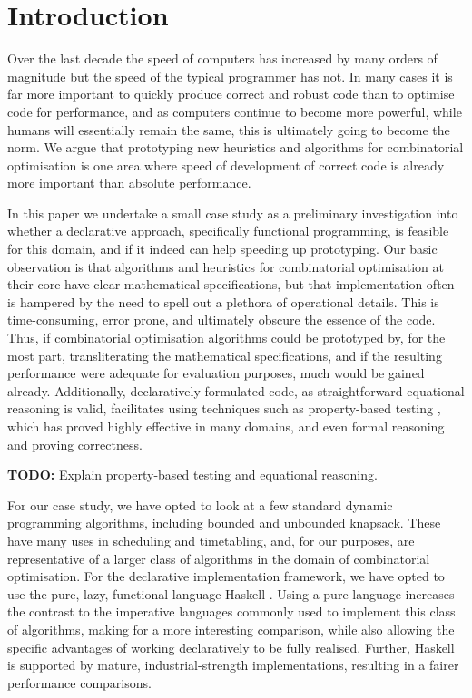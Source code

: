 \section{Introduction}

Over the last decade the speed of computers has increased by many orders of
magnitude but the speed of the typical programmer has not. In many cases it is
far more important to quickly produce correct and robust code than to optimise
code for performance, and as computers continue to become more powerful, while
humans will essentially remain the same, this is ultimately going to become
the norm. We argue that prototyping new heuristics and algorithms for
combinatorial optimisation is one area where speed of development of correct
code is already more important than absolute performance.

In this paper we undertake a small case study as a preliminary investigation
into whether a declarative approach, specifically functional programming, is
feasible for this domain, and if it indeed can help speeding up prototyping.
Our basic observation is that algorithms and heuristics for combinatorial
optimisation at their core have clear mathematical specifications, but that
implementation often is hampered by the need to spell out a plethora of
operational details. This is time-consuming, error prone, and ultimately
obscure the essence of the code. Thus, if combinatorial optimisation
algorithms could be prototyped by, for the most part, transliterating the
mathematical specifications, and if the resulting performance were adequate
for evaluation purposes, much would be gained already. Additionally,
declaratively formulated code, as straightforward equational reasoning is
valid, facilitates using techniques such as property-based testing
\cite{quickcheck}, which has proved highly effective in many domains, and even
formal reasoning and proving correctness.

\textbf{TODO:} Explain property-based testing and equational reasoning.

For our case study, we have opted to look at a few standard dynamic
programming algorithms, including bounded and unbounded knapsack. These have
many uses in scheduling and timetabling, and, for our purposes, are
representative of a larger class of algorithms in the domain of combinatorial
optimisation. For the declarative implementation framework, we have opted to
use the pure, lazy, functional language Haskell \cite{Haskell98Book}. Using a
pure language increases the contrast to the imperative languages commonly used
to implement this class of algorithms, making for a more interesting
comparison, while also allowing the specific advantages of working
declaratively
to be fully realised. Further, Haskell is supported by mature,
industrial-strength implementations, resulting in a fairer performance
comparisons.


